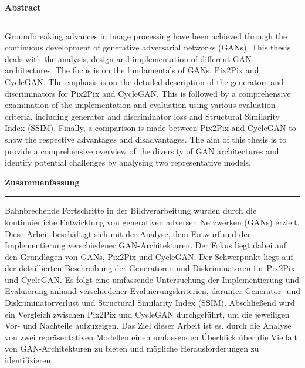 
\begin{addmargin}[0cm]{0cm}
		\begin{center}
			\LARGE{\textbf{Abstract}}\\
			\rule{\textwidth}{0.04cm}	
		\end{center}

Groundbreaking advances in image processing have been achieved through the continuous development of generative adversarial networks (GANs). This thesis deals with the analysis, design and implementation of different GAN architectures. The focus is on the fundamentals of GANs, Pix2Pix and CycleGAN. The emphasis is on the detailed description of the generators and discriminators for Pix2Pix and CycleGAN. This is followed by a comprehensive examination of the implementation and evaluation using various evaluation criteria, including generator and discriminator loss and Structural Similarity Index (SSIM). Finally, a comparison is made between Pix2Pix and CycleGAN to show the respective advantages and disadvantages. The aim of this thesis is to provide a comprehensive overview of the diversity of GAN architectures and identify potential challenges by analysing two representative models.

\vspace{1cm}  

\begin{center}
			\LARGE{\textbf{Zusammenfassung}}\\
			\rule{\textwidth}{0.04cm}	
		\end{center}

Bahnbrechende Fortschritte in der Bildverarbeitung wurden durch die kontinuierliche Entwicklung von generativen adversen Netzwerken (GANs) erzielt. Diese Arbeit beschäftigt sich mit der Analyse, dem Entwurf und der Implementierung verschiedener GAN-Architekturen. Der Fokus liegt dabei auf den Grundlagen von GANs, Pix2Pix und CycleGAN. Der Schwerpunkt liegt auf der detaillierten Beschreibung der Generatoren und Diskriminatoren für Pix2Pix und CycleGAN. Es folgt eine umfassende Untersuchung der Implementierung und Evaluierung anhand verschiedener Evaluierungskriterien, darunter Generator- und Diskriminatorverlust und Structural Similarity Index (SSIM). Abschließend wird ein Vergleich zwischen Pix2Pix und CycleGAN durchgeführt, um die jeweiligen Vor- und Nachteile aufzuzeigen. Das Ziel dieser Arbeit ist es, durch die Analyse von zwei repräsentativen Modellen einen umfassenden Überblick über die Vielfalt von GAN-Architekturen zu bieten und mögliche Herausforderungen zu identifizieren.

\end{addmargin}
\cleardoublepage